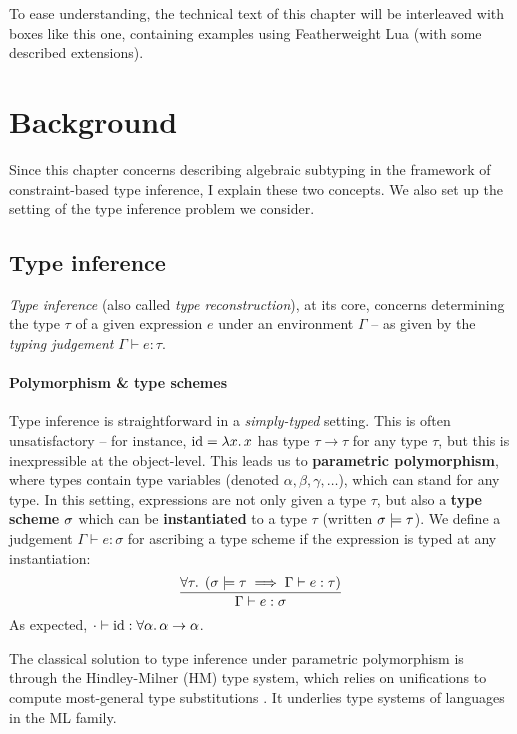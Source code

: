 \begin{example}
    To ease understanding, the technical text of this chapter will be interleaved with boxes like this one, containing examples using Featherweight Lua (with some described extensions).
\end{example}

\section{Background}
\label{sec:ch3background}

Since this chapter concerns describing algebraic subtyping in the framework of constraint-based type inference, I explain these two concepts. We also set up the setting of the type inference problem we consider. 

\subsection{Type inference}
\emph{Type inference} (also called \emph{type reconstruction}), at its core, concerns determining the type $\tau$ of a given expression $e$ under an environment $\Gamma$ -- as given by the \emph{typing judgement} $\Gamma \vdash e : \tau$.

\paragraph{Polymorphism \& type schemes} Type inference is straightforward in a \emph{simply-typed} setting. This is often unsatisfactory -- for instance, $\mathrm{id} =  \lambda x \ldotp x$ has type $\tau \to \tau$ for any type $\tau$, but this is inexpressible at the object-level.
This leads us to \textbf{parametric polymorphism}, where types contain type variables (denoted $\alpha, \beta, \gamma, \dots$), which can stand for any type. 
In this setting, expressions are not only given a type $\tau$, but also a \textbf{type scheme} $\sigma$ which can be \textbf{instantiated} to a type $\tau$ (written $\sigma \models \tau$). We define a judgement $\Gamma \vdash e : \sigma$ for ascribing a type scheme if the expression is typed at any instantiation:
$$ \dfrac{\forall \tau \ldotp\; \left( \sch \models \tau \implies \Gamma \vdash e : \tau \right)}{\Gamma \vdash e : \sigma} $$
As expected, $\cdot \vdash \mathrm{id} : \forall \alpha \ldotp \alpha \to \alpha$.

The classical solution to type inference under parametric polymorphism is through the Hindley-Milner (HM) type system, which relies on unifications to compute most-general type substitutions \cite{essence-of-ml-type-inference, tapl}. It underlies type systems of languages in the ML family.


